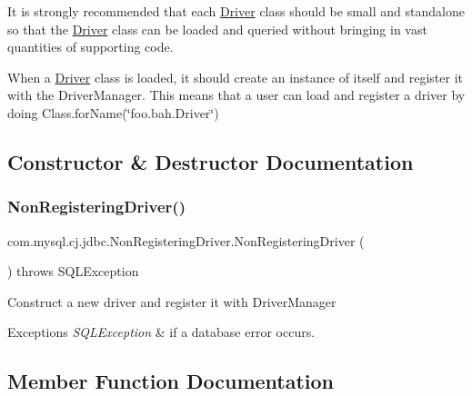 It is strongly recommended that each \mbox{\hyperlink{classcom_1_1mysql_1_1cj_1_1jdbc_1_1_driver}{Driver}} class should be small and standalone so that the \mbox{\hyperlink{classcom_1_1mysql_1_1cj_1_1jdbc_1_1_driver}{Driver}} class can be loaded and queried without bringing in vast quantities of supporting code. 

When a \mbox{\hyperlink{classcom_1_1mysql_1_1cj_1_1jdbc_1_1_driver}{Driver}} class is loaded, it should create an instance of itself and register it with the Driver\+Manager. This means that a user can load and register a driver by doing Class.\+for\+Name(\char`\"{}foo.\+bah.\+Driver\char`\"{}) 

\subsection{Constructor \& Destructor Documentation}
\mbox{\label{classcom_1_1mysql_1_1cj_1_1jdbc_1_1_non_registering_driver_a43d2c5741a06d37722f12c74d34cad9c}} 
\subsubsection{\texorpdfstring{Non\+Registering\+Driver()}{NonRegisteringDriver()}}
{\footnotesize\ttfamily com.\+mysql.\+cj.\+jdbc.\+Non\+Registering\+Driver.\+Non\+Registering\+Driver (\begin{DoxyParamCaption}{ }\end{DoxyParamCaption}) throws S\+Q\+L\+Exception}

Construct a new driver and register it with Driver\+Manager


\begin{DoxyExceptions}{Exceptions}
{\em S\+Q\+L\+Exception} & if a database error occurs. \\
\hline
\end{DoxyExceptions}


\subsection{Member Function Documentation}
\mbox{\label{classcom_1_1mysql_1_1cj_1_1jdbc_1_1_non_registering_driver_a647f9685378b944a3c5c6d9f9c47d7f1}} 
